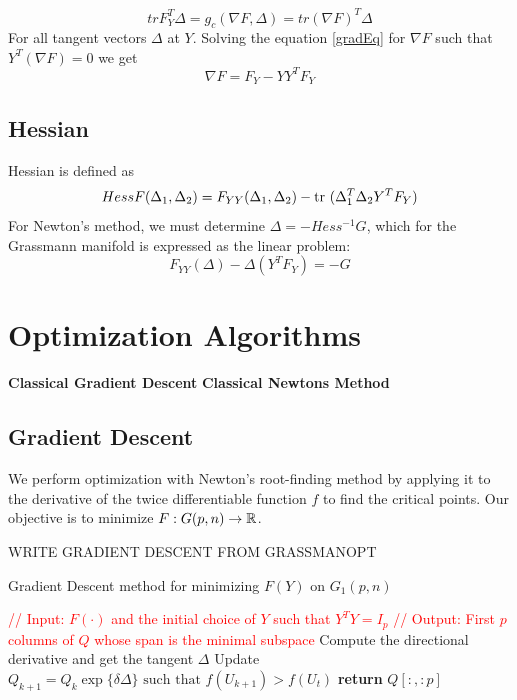\documentclass[11pt,a4paper]{report}
\begin{document}
\begin{equation}\label{gradEq}
    tr F_Y^{T} \Delta = g_c (\nabla F, \Delta) = tr(\nabla F)^T \Delta
\end{equation}
For all tangent vectors $\Delta$ at $Y$. \newline
Solving the equation \ref{gradEq} for $\nabla F$ such that $Y^T(\nabla F) = 0$ we get
\begin{equation}
    \nabla F = F_Y - Y Y^T F_Y
\end{equation}
\section{Hessian}
Hessian is defined as
$$ Hess F(\Delta_1, \Delta_2) = F_{YY}(\Delta_1, \Delta_2) - \textrm{tr }(\Delta_1^T \Delta_2 Y^T F_Y) $$
For Newton's method, we must determine $\Delta = -Hess^{-1}G$, which for the Grassmann manifold is expressed as the linear problem:
$$ F_{YY}(\Delta) - \Delta(Y^T F_{Y}) = -G $$
\chapter{Optimization Algorithms}\label{OptChapter}
\textbf{Classical Gradient Descent}
\textbf{Classical Newtons Method}
\section{Gradient Descent}
We perform optimization with Newton's root-finding method by applying it to the derivative of the twice differentiable function $f$ to find the critical points.
Our objective is to minimize $F: G(p,n) \to \mathbb{R}$. \newline
\begin{algorithm}
    WRITE GRADIENT DESCENT FROM GRASSMANOPT
\caption{Gradient Descent method for minimizing $F(Y)$ on $G_1(p,n)$ }\label{alg:gradG}
    \begin{algorithmic}[1]
        \State \textcolor{red}{// Input: $F(\cdot)$ and the initial choice of $Y$ such that $Y^T Y = I_p$}
        \State \textcolor{red}{// Output: First $p$ columns of $Q$ whose span is the minimal subspace}
        \State Compute the directional derivative and get the tangent $\Delta$
        \State
        \State Update $Q_{k+1} = Q_{k} \exp\{ \delta \Delta \} \text{ such that } f(U_{k+1}) > f(U_t)$
        \EndWhile
        \State \textbf{return} $Q[:,:p]$
        \EndProcedure
    \end{algorithmic}
\end{algorithm}
\end{document}

